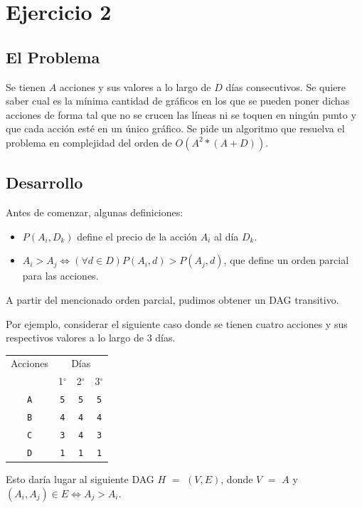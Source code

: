 \section{Ejercicio 2}
\subsection{El Problema}

Se tienen $A$ acciones y sus valores a lo largo de $D$ días consecutivos. Se quiere saber cual es la mínima cantidad de gráficos en los que se pueden poner dichas acciones de forma tal que no se crucen las líneas ni se toquen en ningún punto y que cada acción esté en un único gráfico. Se pide un algoritmo que resuelva el problema en complejidad del orden de $O(A^2 * (A+D))$.

\subsection{Desarrollo}
Antes de comenzar, algunas definiciones:
\begin{itemize}
	\item $P(A_{i},D_{k})$ define el precio de la acción $A_{i}$ al día $D_{k}$.
	\item $A_{i} > A_{j} \Leftrightarrow (\forall d \in D) P(A_{i},d) > P(A_{j},d)$, que define un orden parcial para las acciones.
\end{itemize}
A partir del mencionado orden parcial, pudimos obtener un DAG transitivo.

Por ejemplo, considerar el siguiente caso donde se tienen cuatro acciones y sus respectivos valores a lo largo de 3 días.\\

\begin{center}
\begin{tabular}{|c|c|c|c|}
	\hline
	Acciones & \multicolumn{3}{c|}{Días}\\
	\cline{2-4}
	& 1$^{\circ}$ & 2$^{\circ}$ & 3$^{\circ}$\\
	\hline
	\hline
	\texttt{A} & \texttt{5} & \texttt{5} & \texttt{5} \\
	\hline
	\texttt{B} & \texttt{4} & \texttt{4} & \texttt{4} \\
	\hline
	\texttt{C} & \texttt{3} & \texttt{4} & \texttt{3} \\
	\hline
	\texttt{D} & \texttt{1} & \texttt{1} & \texttt{1} \\
	\hline
\end{tabular}

\end{center}
Esto daría lugar al siguiente DAG $H$ $=$ $(V,E)$, donde $V$ $=$ $A$ y $(A_{i},A_{j}) \in E \Leftrightarrow A_{j} > A_{i}$.

